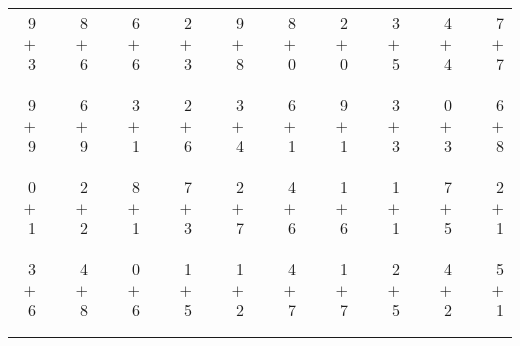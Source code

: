 \documentclass[12pt, letterpaper]{article}
\begin{document}
\begin{tabular}{rrrrrrrrrrrrrrrrrrr}
9 & & 8 & & 6 & & 2 & & 9 & & 8 & & 2 & & 3 & & 4 & & 7\\
$+$ 3 & & $+$ 6 & & $+$ 6 & & $+$ 3 & & $+$ 8 & & $+$ 0 & & $+$ 0 & & $+$ 5 & & $+$ 4 & & $+$ 7\\
\cline{1-1} \cline{3-3} \cline{5-5} \cline{7-7} \cline{9-9} \cline{11-11} \cline{13-13} \cline{15-15} \cline{17-17} \cline{19-19} \\ \\
9 & & 6 & & 3 & & 2 & & 3 & & 6 & & 9 & & 3 & & 0 & & 6\\
$+$ 9 & & $+$ 9 & & $+$ 1 & & $+$ 6 & & $+$ 4 & & $+$ 1 & & $+$ 1 & & $+$ 3 & & $+$ 3 & & $+$ 8\\
\cline{1-1} \cline{3-3} \cline{5-5} \cline{7-7} \cline{9-9} \cline{11-11} \cline{13-13} \cline{15-15} \cline{17-17} \cline{19-19} \\ \\
0 & & 2 & & 8 & & 7 & & 2 & & 4 & & 1 & & 1 & & 7 & & 2\\
$+$ 1 & & $+$ 2 & & $+$ 1 & & $+$ 3 & & $+$ 7 & & $+$ 6 & & $+$ 6 & & $+$ 1 & & $+$ 5 & & $+$ 1\\
\cline{1-1} \cline{3-3} \cline{5-5} \cline{7-7} \cline{9-9} \cline{11-11} \cline{13-13} \cline{15-15} \cline{17-17} \cline{19-19} \\ \\
3 & & 4 & & 0 & & 1 & & 1 & & 4 & & 1 & & 2 & & 4 & & 5\\
$+$ 6 & & $+$ 8 & & $+$ 6 & & $+$ 5 & & $+$ 2 & & $+$ 7 & & $+$ 7 & & $+$ 5 & & $+$ 2 & & $+$ 1\\
\cline{1-1} \cline{3-3} \cline{5-5} \cline{7-7} \cline{9-9} \cline{11-11} \cline{13-13} \cline{15-15} \cline{17-17} \cline{19-19} \\ \\
\end{tabular}
\newpage
\end{document}
